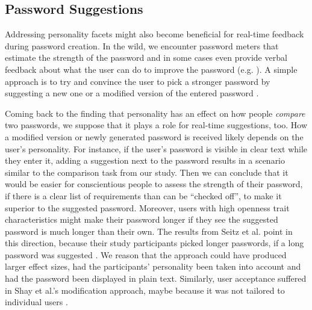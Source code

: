 \subsection{Password Suggestions}
Addressing personality facets might also become beneficial for real-time feedback during password creation. In the wild, we encounter password meters that estimate the strength of the password and in some cases even provide verbal feedback about what the user can do to improve the password (e.g. \cite{Wheeler2016zxcvbn}). A simple approach is to try and convince the user to pick a stronger password by suggesting a new one or a modified version of the entered password \cite{Forget2008ImprovingPasswordsThroughPersuasion, Seitz2016SuggestionsDecoy, Shay2015SpoonfulOfSugar}. 

Coming back to the finding that personality has an effect on how people \textit{compare} two passwords, we suppose that it plays a role for real-time suggestions, too. How a modified version or newly generated password is received likely depends on the user's personality. For instance, if the user's password is visible in clear text while they enter it, adding a suggestion next to the password results in a scenario similar to the comparison task from our study. Then we can conclude that it would be easier for conscientious people to assess the strength of their password, if there is a clear list of requirements than can be ``checked off'', to make it superior to the suggested password. Moreover, users with high openness trait characteristics might make their password longer if they see the suggested password is much longer than their own. The results from Seitz et al. point in this direction, because their study participants picked longer passwords, if a long password was suggested \cite{Seitz2016SuggestionsDecoy}. We reason that the approach could have produced larger effect sizes, had the participants' personality been taken into account and had the password been displayed in plain text. Similarly, user acceptance suffered in Shay et al.'s modification approach, maybe because it was not tailored to individual users \cite{Shay2015SpoonfulOfSugar}.



